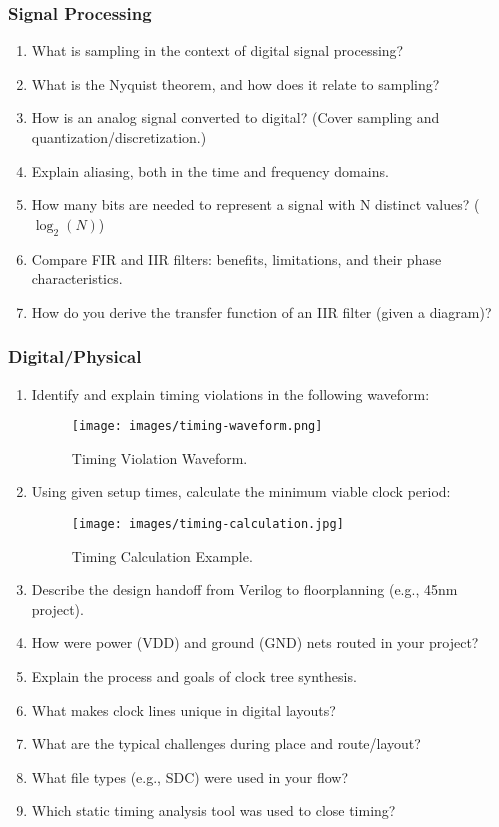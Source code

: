 \subsubsection*{Signal Processing}
\begin{enumerate}
    \item What is sampling in the context of digital signal processing?
    \item What is the Nyquist theorem, and how does it relate to sampling?
    \item How is an analog signal converted to digital? (Cover sampling and quantization/discretization.)
    \item Explain aliasing, both in the time and frequency domains.
    \item How many bits are needed to represent a signal with N distinct values? ($\log_2(N)$)
    \item Compare FIR and IIR filters: benefits, limitations, and their phase characteristics.
    \item How do you derive the transfer function of an IIR filter (given a diagram)?
\end{enumerate}

\subsubsection*{Digital/Physical}
\begin{enumerate}
    \item Identify and explain timing violations in the following waveform:
        \begin{figure}[H]
            \centering
            \texttt{[image: images/timing-waveform.png]}
            \caption{Timing Violation Waveform.}
        \end{figure}
    \item Using given setup times, calculate the minimum viable clock period:
        \begin{figure}[H]
            \centering
            \texttt{[image: images/timing-calculation.jpg]}
            \caption{Timing Calculation Example.}
        \end{figure}
    \item Describe the design handoff from Verilog to floorplanning (e.g., 45nm project).
    \item How were power (VDD) and ground (GND) nets routed in your project?
    \item Explain the process and goals of clock tree synthesis.
    \item What makes clock lines unique in digital layouts?
    \item What are the typical challenges during place and route/layout?
    \item What file types (e.g., SDC) were used in your flow?
    \item Which static timing analysis tool was used to close timing?
\end{enumerate}

